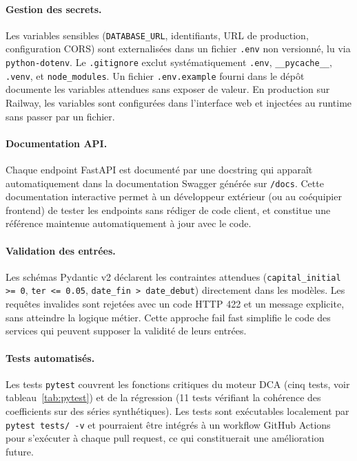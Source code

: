 \documentclass[11pt,a4paper]{article}
\begin{document}
\paragraph{Gestion des secrets.}
Les variables sensibles (\texttt{DATABASE\_URL}, identifiants, URL de
production, configuration CORS) sont externalisées dans un fichier
\texttt{.env} non versionné, lu via \texttt{python-dotenv}. Le
\texttt{.gitignore} exclut systématiquement \texttt{.env},
\texttt{\_\_pycache\_\_}, \texttt{.venv}, et \texttt{node\_modules}.
Un fichier \texttt{.env.example} fourni dans le dépôt documente les
variables attendues sans exposer de valeur. En production sur
Railway, les variables sont configurées dans l'interface web et
injectées au runtime sans passer par un fichier.

\paragraph{Documentation API.}
Chaque endpoint FastAPI est documenté par une docstring qui apparaît
automatiquement dans la documentation Swagger générée sur
\texttt{/docs}. Cette documentation interactive permet à un
développeur extérieur (ou au coéquipier frontend) de tester les
endpoints sans rédiger de code client, et constitue une référence
maintenue automatiquement à jour avec le code.

\paragraph{Validation des entrées.}
Les schémas Pydantic v2 déclarent les contraintes attendues
(\texttt{capital\_initial >= 0}, \texttt{ter <= 0.05},
\texttt{date\_fin > date\_debut}) directement dans les modèles. Les
requêtes invalides sont rejetées avec un code HTTP 422 et un message
explicite, sans atteindre la logique métier. Cette approche
\og fail fast \fg simplifie le code des services qui peuvent
supposer la validité de leurs entrées.

\paragraph{Tests automatisés.}
Les tests \texttt{pytest} couvrent les fonctions critiques du moteur
DCA (cinq tests, voir tableau~\ref{tab:pytest}) et de la régression
(11 tests vérifiant la cohérence des coefficients sur des
séries synthétiques). Les tests sont exécutables localement par
\texttt{pytest tests/ -v} et pourraient être intégrés à un workflow
GitHub Actions pour s'exécuter à chaque pull request, ce qui
constituerait une amélioration future.
\end{document}
